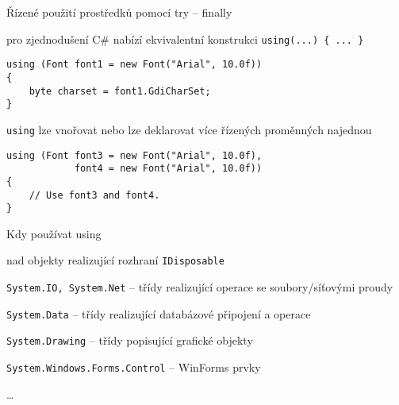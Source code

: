 \begin{frame}[fragile]
\vfill
\begin{bitemize}{Řízené použití prostředků pomocí try -- finally}
\item pro zjednodušení C\# nabízí ekvivalentní konstrukci \lstinline|using(...) { ... }|
\end{bitemize}
\vfill
\begin{yesblock} 
\begin{lstlisting}
using (Font font1 = new Font("Arial", 10.0f))
{
    byte charset = font1.GdiCharSet;
}
\end{lstlisting}
\end{yesblock}
\vfill
\begin{bitemize}{}
\item \lstinline|using| lze vnořovat nebo lze deklarovat více řízených proměnných najednou
\end{bitemize}
\vfill
\begin{yesblock}
\begin{lstlisting}
using (Font font3 = new Font("Arial", 10.0f),
            font4 = new Font("Arial", 10.0f))
{
    // Use font3 and font4.
}
\end{lstlisting}
\end{yesblock}
\end{frame}


\begin{frame}[fragile]
\begin{bitemize}{Kdy používat using}
\item nad objekty realizující rozhraní \lstinline|IDisposable|
\item \lstinline|System.IO, System.Net| -- třídy realizující operace se soubory/síťovými proudy
\item \lstinline|System.Data| -- třídy realizující databázové připojení a operace
\item \lstinline|System.Drawing| -- třídy popisující grafické objekty
\item \lstinline|System.Windows.Forms.Control| -- WinForms prvky
\item \ldots
\end{bitemize}
\end{frame}


